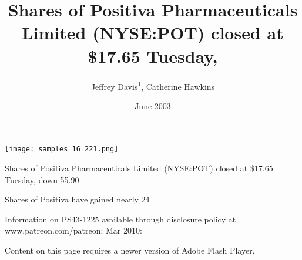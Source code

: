 \documentclass{article}
\title{Shares of Positiva Pharmaceuticals Limited (NYSE:POT) closed at \$17.65 Tuesday,}
\author{Jeffrey Davis\textsuperscript{1},  Catherine Hawkins}
\affil{\textsuperscript{1}Oregon State University}
\date{June 2003}
\begin{document}
\maketitle

\begin{center}
\begin{minipage}{0.75\linewidth}
\texttt{[image: samples\_16\_221.png]}
\end{minipage}
\end{center}

Shares of Positiva Pharmaceuticals Limited (NYSE:POT) closed at \$17.65 Tuesday, down 55.90%

Shares of Positiva have gained nearly 24%

Information on PS43-1225 available through disclosure policy at www.patreon.com/patreon; Mar 2010:

Content on this page requires a newer version of Adobe Flash Player.
\end{document}
